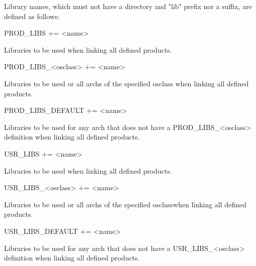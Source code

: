 Library names, which must not have a directory and "lib" prefix nor a suffix, are defined as follows:

\begin{description}\item {}PROD\_LIBS += \textless{}name\textgreater{}

\end{description}Libraries to be used when linking all defined products.

\begin{description}\item PROD\_LIBS\_\textless{}osclass\textgreater{} += \textless{}name\textgreater{}

\end{description}Libraries to be used or all archs of the specified osclass when linking all defined products.

\begin{description}\item PROD\_LIBS\_DEFAULT += \textless{}name\textgreater{}

\end{description}Libraries to be used for any arch that does not have a PROD\_LIBS\_\textless{}osclass\textgreater{} definition when linking all 
defined products.



\begin{description}\item {}USR\_LIBS += \textless{}name\textgreater{}

\end{description}Libraries to be used when linking all defined products.

\begin{description}\item USR\_LIBS\_\textless{}osclass\textgreater{} += \textless{}name\textgreater{}

\end{description}Libraries to be used or all archs of the specified osclasswhen linking all defined products.

\begin{description}\item USR\_LIBS\_DEFAULT += \textless{}name\textgreater{}

\end{description}Libraries to be used for any arch that does not have a USR\_LIBS\_\textless{}osclass\textgreater{} definition when linking all 
defined products.



